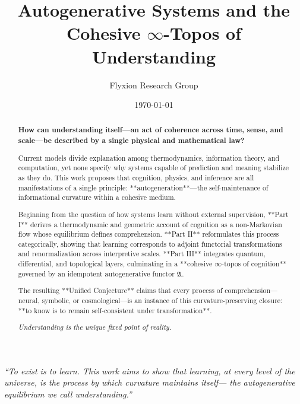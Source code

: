 \documentclass[12pt,a4paper,twoside,openright]{book}
\title{Autogenerative Systems and the Cohesive $\infty$-Topos of Understanding}
\author{Flyxion Research Group}
\date{\today}
\begin{document}
\maketitle

\begin{abstract}
\thispagestyle{empty}
\vspace{2em}
{\large\bfseries How can understanding itself—an act of coherence across time, sense, and scale—be described by a single physical and mathematical law?}

Current models divide explanation among thermodynamics, information theory, and computation, yet none specify why systems capable of prediction and meaning stabilize as they do.  
This work proposes that cognition, physics, and inference are all manifestations of a single principle: **autogeneration**—the self-maintenance of informational curvature within a cohesive medium.

Beginning from the question of how systems learn without external supervision, **Part I** derives a thermodynamic and geometric account of cognition as a non-Markovian flow whose equilibrium defines comprehension.  
**Part II** reformulates this process categorically, showing that learning corresponds to adjoint functorial transformations and renormalization across interpretive scales.  
**Part III** integrates quantum, differential, and topological layers, culminating in a **cohesive $\infty$-topos of cognition** governed by an idempotent autogenerative functor $\mathfrak{A}$.

The resulting **Unified Conjecture** claims that every process of comprehension—neural, symbolic, or cosmological—is an instance of this curvature-preserving closure: **to know is to remain self-consistent under transformation**.

\vspace{2em}
\raggedleft\itshape
Understanding is the unique fixed point of reality.
\end{abstract}

\clearpage
\thispagestyle{empty}
\vspace*{\fill}
\begin{center}
\begin{minipage}{0.8\textwidth}
\centering
\itshape
``To exist is to learn.  
This work aims to show that learning, at every level of the universe,  
is the process by which curvature maintains itself—  
the autogenerative equilibrium we call understanding.''
\end{minipage}
\end{center}
\vspace*{\fill}
\end{document}
